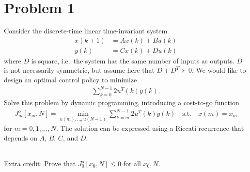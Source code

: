 \section*{Problem 1}

Consider the discrete-time linear time-invariant system
\begin{align*}
    x(k+1) & = Ax(k) + Bu(k) \\
    y(k) & = Cx(k) + Du(k)
\end{align*}
where $D$ is square, i.e.\ the system has the same number of inputs as outputs. $D$ is not necessarily symmetric, but assume here that $D + D^T \succ 0$. We would like to design an optimal control policy to minimize
\begin{align*}
    \sum_{k=0}^{N-1} 2 u^T(k) y(k) .
\end{align*}
Solve this problem by dynamic programming, introducing a cost-to-go function
\begin{align*}
    J_m^o[x_m,N] = \min_{u(m),\ldots,u(N-1)} \sum_{k=m}^{N-1} 2u^T(k) y(k) \quad \textrm{s.t.} \quad x(m) = x_m
\end{align*}
for $m = 0,1,\ldots,N$. The solution can be expressed using a Riccati recurrence that depends on $A$, $B$, $C$, and $D$.

~\\
\noindent
Extra credit: Prove that $J_0^o[x_0,N] \leq 0$ for all $x_0, N$.

